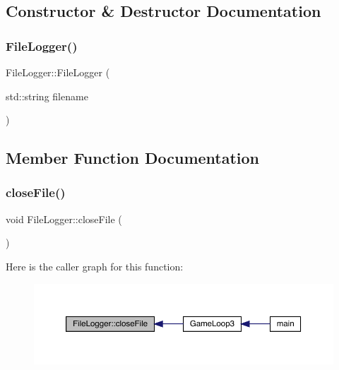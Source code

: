 \subsection{Constructor \& Destructor Documentation}
\mbox{\label{class_file_logger_a7e1527826890498c11dd2f09c6c04c7e}} 
\subsubsection{\texorpdfstring{File\+Logger()}{FileLogger()}}
{\footnotesize\ttfamily File\+Logger\+::\+File\+Logger (\begin{DoxyParamCaption}\item[{std\+::string}]{filename }\end{DoxyParamCaption})}



\subsection{Member Function Documentation}
\mbox{\label{class_file_logger_a615be6cc97dec3ad38a085b063669f8e}} 
\subsubsection{\texorpdfstring{close\+File()}{closeFile()}}
{\footnotesize\ttfamily void File\+Logger\+::close\+File (\begin{DoxyParamCaption}{ }\end{DoxyParamCaption})}

Here is the caller graph for this function\+:
\nopagebreak
\begin{figure}[H]
\begin{center}
\leavevmode
\includegraphics[width=350pt]{de/db9/class_file_logger_a615be6cc97dec3ad38a085b063669f8e_icgraph}
\end{center}
\end{figure}
\mbox{\label{class_file_logger_a5bb4f335d8d25b52ba2799d8b73ba037}} 
